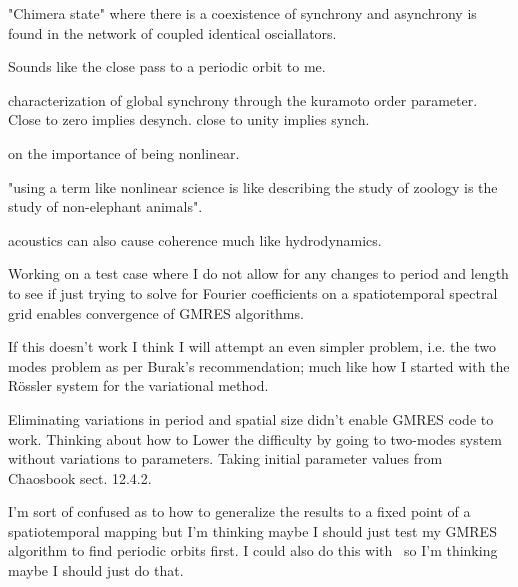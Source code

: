 \begin{description}
{\begin{description}
"Chimera state" where there is a coexistence of synchrony and asynchrony
is found in the network of coupled identical osciallators.

Sounds like the close pass to a periodic orbit to me.

characterization of global synchrony through the kuramoto
order parameter.
Close to zero implies desynch. close to unity implies synch.

on the importance of being nonlinear.

"using a term like nonlinear science is like describing the
study of zoology is the study of non-elephant animals".

acoustics can also cause coherence much like
hydrodynamics.

\item[torus code]
Working on a test case where I do not allow for any changes to period and length
to see if just trying to solve for Fourier coefficients on a spatiotemporal
spectral grid enables convergence of GMRES algorithms.

If this doesn't work I think I will attempt an even simpler problem, i.e.
the two modes problem as per Burak's recommendation; much like how I started
with the R\"ossler system for the variational method.

\item[two mode]
Eliminating variations in period and spatial size didn't enable GMRES
code to work.
Thinking about how to
Lower the difficulty by going to two-modes system without
variations to parameters. Taking initial parameter values from Chaosbook sect. 12.4.2.

I'm sort of confused as to how to generalize the results to a fixed point of a spatiotemporal mapping
but I'm thinking maybe I should just test my GMRES algorithm to find periodic orbits first.
I could also do this with \KS\ so I'm thinking maybe I should just do that.
\end{description}
}

\end{description}
